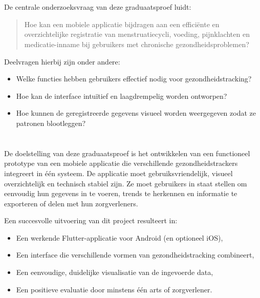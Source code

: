 \section{}%
\label{sec:onderzoeksvraag}

De centrale onderzoeksvraag van deze graduaatsproef luidt:

\begin{quote}
    Hoe kan een mobiele applicatie bijdragen aan een efficiënte en overzichtelijke registratie van menstruatiecycli, voeding, pijnklachten en medicatie-inname bij gebruikers met chronische gezondheidsproblemen?
\end{quote}

Deelvragen hierbij zijn onder andere: 
\begin{itemize}
    \item Welke functies hebben gebruikers effectief nodig voor gezondheidstracking?
    \item Hoe kan de interface intuïtief en laagdrempelig worden ontworpen?
    \item Hoe kunnen de geregistreerde gegevens visueel worden weergegeven zodat ze patronen blootleggen?
\end{itemize}

\section{}%
\label{sec:onderzoeksdoelstelling}
De doelstelling van deze graduaatsproef is het ontwikkelen van een functioneel prototype van een mobiele applicatie die verschillende gezondheidstrackers integreert in één systeem. 
De applicatie moet gebruiksvriendelijk, visueel overzichtelijk en technisch stabiel zijn. Ze moet gebruikers in staat stellen om eenvoudig hun gegevens in te voeren, trends te herkennen en informatie te exporteren of delen met hun zorgverleners.

Een succesvolle uitvoering van dit project resulteert in: 
\begin{itemize}
    \item Een werkende Flutter-applicatie voor Android (en optioneel iOS),
    \item Een interface die verschillende vormen van gezondheidstracking combineert,
    \item Een eenvoudige, duidelijke visualisatie van de ingevoerde data,
    \item Een positieve evaluatie door minstens één arts of zorgverlener. 
\end{itemize}

